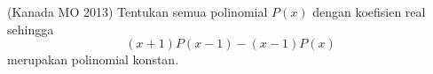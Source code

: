 \documentclass[11pt]{scrartcl}
\begin{document}

\begin{problem}
(Kanada MO 2013) Tentukan semua polinomial $P(x)$ dengan koefisien real sehingga \[(x + 1)P(x - 1) - (x - 1)P(x)\] merupakan polinomial konstan.
\end{problem}
    
\end{document}
